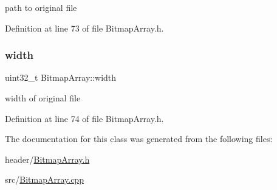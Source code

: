 path to original file 

Definition at line 73 of file Bitmap\+Array.\+h.

\mbox{\label{classBitmapArray_a44f51b2c1ecde3f9aa504df25d65b6c9}} 
\subsubsection{\texorpdfstring{width}{width}}
{\footnotesize\ttfamily uint32\+\_\+t Bitmap\+Array\+::width\hspace{0.3cm}{\ttfamily [private]}}

width of original file 

Definition at line 74 of file Bitmap\+Array.\+h.



The documentation for this class was generated from the following files\+:\begin{DoxyCompactItemize}
\item 
header/\mbox{\hyperlink{BitmapArray_8h}{Bitmap\+Array.\+h}}\item 
src/\mbox{\hyperlink{BitmapArray_8cpp}{Bitmap\+Array.\+cpp}}\end{DoxyCompactItemize}
